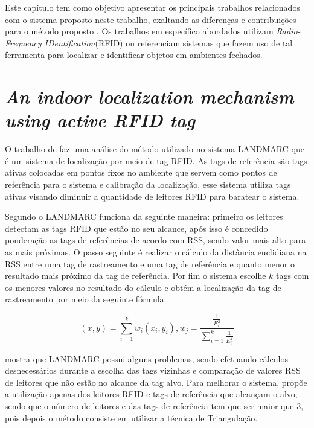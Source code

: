 
\label{chapter:correlatos}

Este capítulo tem como objetivo apresentar os principais trabalhos relacionados com o sistema proposto neste trabalho, 
exaltando as diferenças e contribuições para o método proposto . Os trabalhos em específico abordados 
utilizam \textit{Radio-Frequency IDentification}(RFID) ou referenciam sistemas que fazem uso de tal ferramenta para localizar e identificar objetos em ambientes 
fechados.

%
%
\section{\textit{An indoor localization mechanism using active RFID tag}}

O trabalho de  faz uma análise do método utilizado no sistema LANDMARC 
que é um sistema de localização por meio de tag RFID. As tags de referência são tags ativas colocadas em pontos fixos no ambiente
que servem como pontos de referência para o sistema e calibração da localização, esse sistema utiliza tags ativas visando 
diminuir a quantidade de leitores RFID para baratear o sistema.

Segundo  o LANDMARC funciona da seguinte maneira: primeiro os leitores detectam as tags RFID que estão 
no seu alcance, após isso é concedido ponderação as tags de referências de acordo com RSS, sendo valor mais alto para as mais 
próximas. O passo seguinte é realizar o cálculo da distância euclidiana na RSS entre uma tag de rastreamento e uma tag de 
referência e quanto menor o resultado mais próximo da tag de referência. Por fim o sistema escolhe $k$ tags com os menores valores no 
resultado do cálculo e obtém a localização da tag de rastreamento por meio da seguinte fórmula.

\begin{equation}
(x,y) = \sum^k_{i=1}w_i(x_i,y_i), w_j=\frac{\frac{1}{E_i^2}}{\sum_{i=1}^k\frac{1}{E^2_i}} 
\end{equation}


 mostra que LANDMARC possui alguns problemas, sendo efetuando cálculos desnecessários 
durante a escolha das tags vizinhas e comparação de valores RSS de leitores que não estão no alcance da tag alvo. 
Para melhorar o sistema,  propõe a utilização apenas dos leitores RFID  e tags de referência 
que alcançam o alvo, sendo que o número de leitores e das tags de referência tem que ser maior que 
$3$, pois depois o método consiste em utilizar a técnica de Triangulação.


